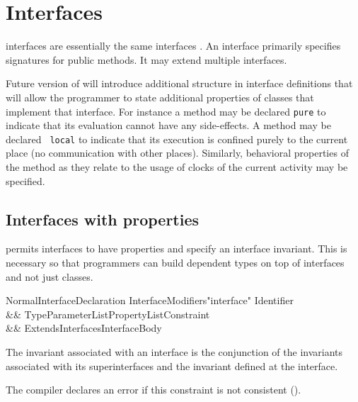 \chapter{Interfaces}
\label{XtenInterfaces}

{}\XtenCurrVer{} interfaces are essentially the same \java{}
interfaces \cite[\S 9]{jls2}. An interface primarily specifies
signatures for public methods. It may extend multiple interfaces. 


Future version of \Xten{} will introduce additional structure in
interface definitions that will allow the programmer to state
additional properties of classes that implement that interface. For
instance a method may be declared {\tt pure} to indicate that its
evaluation cannot have any side-effects. A method may be declared {\tt
local} to indicate that its execution is confined purely to the
current place (no communication with other places). Similarly,
behavioral properties of the method as they relate to the usage of
clocks of the current activity may be specified.

\section{Interfaces with properties}\label{DepType:Interface}

\Xten{} permits interfaces to have properties and specify an interface
invariant. This is necessary so that programmers can build dependent
types on top of interfaces and not just classes.

\begin{grammar}
NormalInterfaceDeclaration \:
      InterfaceModifiers\opt \xcd"interface" Identifier  \\
   && TypeParameterList\opt PropertyList\opt Constraint\opt \\
   && ExtendsInterfaces\opt InterfaceBody \\
\end{grammar}

\noindent
The invariant associated with an interface is the conjunction of the
invariants associated with its superinterfaces and the invariant
defined at the interface. 


\begin{staticrule*}
   The compiler declares an error if this constraint
   is not consistent ().  
\end{staticrule*}

